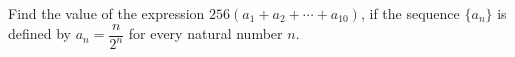 Find the value of the expression $256(a_{1}+a_{2}+\cdots+a_{10})$, if the sequence $\{a_{n}\}$ is defined by $a_{n}=\dfrac{n}{2^{n}}$ for every natural number $n$.
